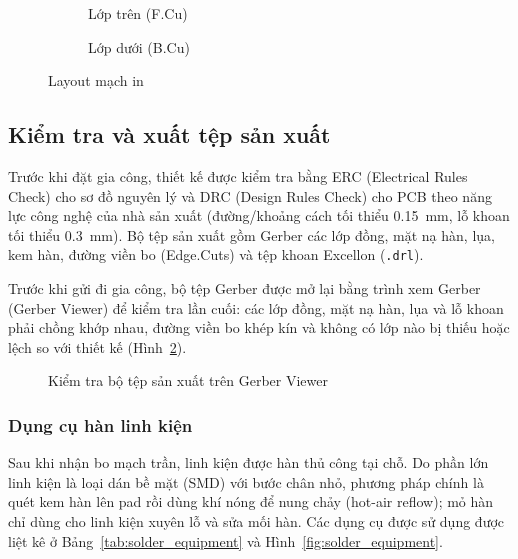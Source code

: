 \begin{figure}[H]
\centering
\begin{subfigure}{0.49\linewidth}\centering{}\caption{Lớp trên (F.Cu)}\end{subfigure}
\hfill
\begin{subfigure}{0.49\linewidth}\centering{}\caption{Lớp dưới (B.Cu)}\end{subfigure}
\caption{Layout mạch in \proj}
\label{fig:layout}
\end{figure}

\subsection{Kiểm tra và xuất tệp sản xuất}
Trước khi đặt gia công, thiết kế được kiểm tra bằng ERC (Electrical Rules Check) cho sơ đồ nguyên lý và DRC (Design Rules Check) cho PCB theo năng lực công nghệ của nhà sản xuất (đường/khoảng cách tối thiểu \SI{0.15}{\milli\metre}, lỗ khoan tối thiểu \SI{0.3}{\milli\metre}). Bộ tệp sản xuất gồm Gerber các lớp đồng, mặt nạ hàn, lụa, kem hàn, đường viền bo (Edge.Cuts) và tệp khoan Excellon (\texttt{.drl}).

Trước khi gửi đi gia công, bộ tệp Gerber được mở lại bằng trình xem Gerber (Gerber Viewer) để kiểm tra lần cuối: các lớp đồng, mặt nạ hàn, lụa và lỗ khoan phải chồng khớp nhau, đường viền bo khép kín và không có lớp nào bị thiếu hoặc lệch so với thiết kế (Hình~\ref{fig:gerber}).

\begin{figure}[H]
\centering
{}
\caption{Kiểm tra bộ tệp sản xuất trên Gerber Viewer}
\label{fig:gerber}
\end{figure}

\subsubsection{Dụng cụ hàn linh kiện}
Sau khi nhận bo mạch trần, linh kiện được hàn thủ công tại chỗ. Do phần lớn linh kiện là loại dán bề mặt (SMD) với bước chân nhỏ, phương pháp chính là quét kem hàn lên pad rồi dùng khí nóng để nung chảy (hot-air reflow); mỏ hàn chỉ dùng cho linh kiện xuyên lỗ và sửa mối hàn. Các dụng cụ được sử dụng được liệt kê ở Bảng~\ref{tab:solder_equipment} và Hình~\ref{fig:solder_equipment}.

